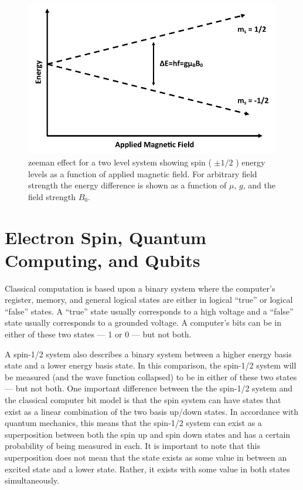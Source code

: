 \documentclass[oneside, noacknowlegments]{BYUPhys}
\begin{document}
\begin{figure}
    \centerline{\includegraphics{zeeman_fig}}
    \caption[zeeman effect and Resonant Conditions in Matter]{\label{fig:Zeeman}
     zeeman effect for a two level system showing spin ( $\pm 1/2$ ) energy levels as a function of applied magnetic field. For arbitrary field strength the energy difference is shown as a function of $\mu$, $g$, and the field strength $B_0$.}
\end{figure}

\section{Electron Spin, Quantum Computing, and Qubits}

Classical computation is based upon a binary system where the computer's register, memory, and general logical states are either in logical ``true'' or logical ``false'' states. A ``true'' state usually corresponds to a high voltage and a ``false'' state usually corresponds to a grounded voltage. A computer's bits can be in either of these two states --- 1 or 0 --- but not both.

A spin-1/2 system also describes a binary system between a higher energy basis state and a lower energy basis state. In this comparison, the spin-1/2 system will be measured (and the wave function collapsed) to be in either of these two states --- but not both. One important difference between the the spin-1/2 system and the classical computer bit model is that the spin system can have states that exist as a linear combination of the two basis up/down states. In accordance with quantum mechanics, this means that the spin-1/2 system can exist as a superposition between both the spin up and spin down states and has a certain probability of being measured in each. It is important to note that this superposition does not mean that the state exists as some value in between an excited state and a lower state. Rather, it exists with some value in both states simultaneously.
\end{document}
